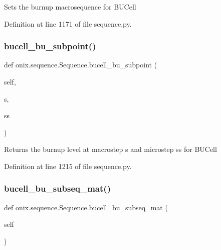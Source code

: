 \begin{DoxyVerb}Sets the burnup macrosequence for BUCell
\end{DoxyVerb}
 

Definition at line 1171 of file sequence.\+py.

\mbox{\label{classonix_1_1sequence_1_1Sequence_a17975d73f0999524afcfeae5a1fbb3ad}} 
\subsubsection{\texorpdfstring{bucell\+\_\+bu\+\_\+subpoint()}{bucell\_bu\_subpoint()}}
{\footnotesize\ttfamily def onix.\+sequence.\+Sequence.\+bucell\+\_\+bu\+\_\+subpoint (\begin{DoxyParamCaption}\item[{}]{self,  }\item[{}]{s,  }\item[{}]{ss }\end{DoxyParamCaption})}

\begin{DoxyVerb}Returns the burnup level at macrostep s and microstep ss for BUCell\end{DoxyVerb}
 

Definition at line 1215 of file sequence.\+py.

\mbox{\label{classonix_1_1sequence_1_1Sequence_a263ba1d4cdb10ad54d6dfeff4f60f875}} 
\subsubsection{\texorpdfstring{bucell\+\_\+bu\+\_\+subseq\+\_\+mat()}{bucell\_bu\_subseq\_mat()}\hspace{0.1cm}{\footnotesize\ttfamily [1/2]}}
{\footnotesize\ttfamily def onix.\+sequence.\+Sequence.\+bucell\+\_\+bu\+\_\+subseq\+\_\+mat (\begin{DoxyParamCaption}\item[{}]{self }\end{DoxyParamCaption})}

